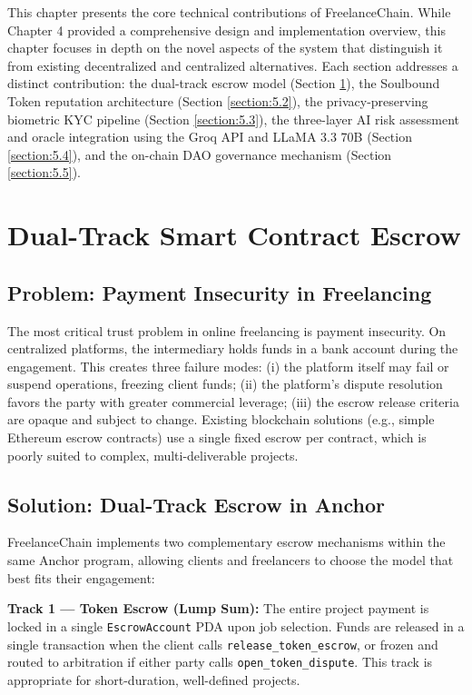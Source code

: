 This chapter presents the core technical contributions of FreelanceChain. While Chapter 4 provided a comprehensive design and implementation overview, this chapter focuses in depth on the novel aspects of the system that distinguish it from existing decentralized and centralized alternatives. Each section addresses a distinct contribution: the dual-track escrow model (Section \ref{section:5.1}), the Soulbound Token reputation architecture (Section \ref{section:5.2}), the privacy-preserving biometric KYC pipeline (Section \ref{section:5.3}), the three-layer AI risk assessment and oracle integration using the Groq API and LLaMA 3.3 70B (Section \ref{section:5.4}), and the on-chain DAO governance mechanism (Section \ref{section:5.5}).

\section{Dual-Track Smart Contract Escrow}
\label{section:5.1}

\subsection{Problem: Payment Insecurity in Freelancing}

The most critical trust problem in online freelancing is payment insecurity. On centralized platforms, the intermediary holds funds in a bank account during the engagement. This creates three failure modes: (i) the platform itself may fail or suspend operations, freezing client funds; (ii) the platform's dispute resolution favors the party with greater commercial leverage; (iii) the escrow release criteria are opaque and subject to change. Existing blockchain solutions (e.g., simple Ethereum escrow contracts) use a single fixed escrow per contract, which is poorly suited to complex, multi-deliverable projects.

\subsection{Solution: Dual-Track Escrow in Anchor}

FreelanceChain implements two complementary escrow mechanisms within the same Anchor program, allowing clients and freelancers to choose the model that best fits their engagement:

\textbf{Track 1 --- Token Escrow (Lump Sum):} The entire project payment is locked in a single \texttt{EscrowAccount} PDA upon job selection. Funds are released in a single transaction when the client calls \texttt{release\_token\_escrow}, or frozen and routed to arbitration if either party calls \texttt{open\_token\_dispute}. This track is appropriate for short-duration, well-defined projects.

